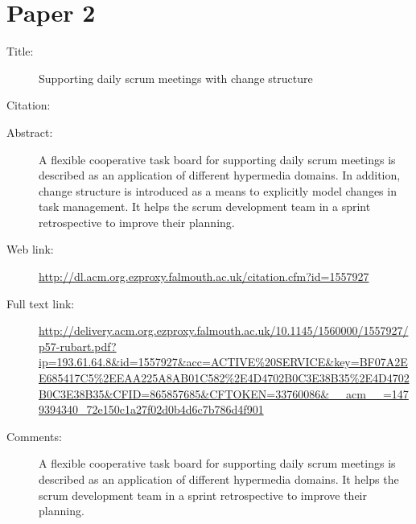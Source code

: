 \documentclass{scrartcl}
\begin{document}
\section*{Paper 2}
\begin{description}
\item[Title:] Supporting daily scrum meetings with change structure
\item[Citation:] \cite{bibtex_key}
\item[Abstract:] A flexible cooperative task board for supporting daily scrum meetings is described as an application of different hypermedia domains. In addition, change structure is introduced as a means to explicitly model changes in task management. It helps the scrum development team in a sprint retrospective to improve their planning.
\item[Web link:] \url{http://dl.acm.org.ezproxy.falmouth.ac.uk/citation.cfm?id=1557927}
\item[Full text link:] \url{http://delivery.acm.org.ezproxy.falmouth.ac.uk/10.1145/1560000/1557927/p57-rubart.pdf?ip=193.61.64.8&id=1557927&acc=ACTIVE%20SERVICE&key=BF07A2EE685417C5%2EEAA225A8AB01C582%2E4D4702B0C3E38B35%2E4D4702B0C3E38B35&CFID=865857685&CFTOKEN=33760086&__acm__=1479394340_72e150c1a27f02d0b4d6c7b786d4f901}
\item[Comments:] A flexible cooperative task board for supporting daily scrum meetings is described as an application of different hypermedia domains. It helps the scrum development team in a sprint retrospective to improve their planning.
\end{description}
\end{document}
